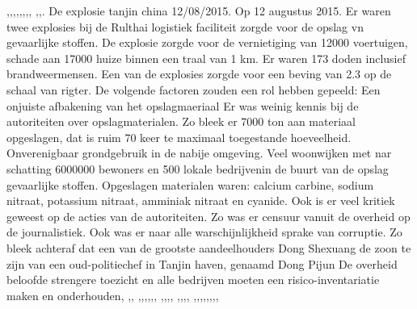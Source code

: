 \cite{wikiSchipholbrand},\cite{schipholbrand27102005video},\cite{onderzoeksraad2610schipholoost},\cite{schipholbrandvideoargos},\cite{nunl30052023feitenoverzicht},\cite{singeluitgeverijenSchipholbrand},\cite{eenvandaagschipholbrand},\cite{parlementairemonitorschipholbrand},
\cite{videonpoNOVA13112008},\cite{rizoomes01052014schipholbrand},\cite{heuvelkroesschipholbrandcamerabeelden}. 
\newline \indent De explosie tanjin china 12/08/2015. 
Op 12 augustus 2015. Er waren twee explosies bij de Rulthai logistiek  faciliteit zorgde voor de opslag vn  gevaarlijke stoffen. De explosie zorgde voor de vernietiging van 12000 voertuigen, schade aan 17000 huize binnen een traal van 1 km. Er waren 173 doden inclusief brandweermensen.
Een van de explosies zorgde voor  een beving van 2.3 op de schaal van rigter.
De volgende factoren zouden een rol hebben gepeeld:
Een onjuiste afbakening van het opslagmaeriaal
Er was  weinig kennis bij de autoriteiten over  opslagmaterialen. Zo bleek er 7000 ton aan materiaal opgeslagen, dat is ruim 70 keer te maximaal toegestande hoeveelheid. 
Onverenigbaar grondgebruik in de nabije omgeving. Veel woonwijken met nar schatting 6000000 bewoners en 500 lokale bedrijvenin de buurt van de opslag gevaarlijke stoffen.
Opgeslagen materialen  waren: calcium carbine, sodium nitraat, potassium nitraat, amminiak nitraat en cyanide.
Ook is er veel kritiek geweest op de acties van de autoriteiten. Zo was er censuur vanuit de overheid op de journalistiek.
Ook was er naar alle warschijnlijkheid sprake van corruptie. Zo bleek achteraf dat een van de grootste aandeelhouders Dong Shexuang de zoon te zijn van een oud-politiechef in Tanjin haven, genaamd Dong Pijun
De overheid beloofde strengere toezicht en alle bedrijven moeten een risico-inventariatie maken en onderhouden\cite{jiang16042019TanjinExplosion},
\cite{staff31082015tanjinblastunrevealed},\cite{chinafile18082015tanjinexplosion},
\cite{pinghuang2410201TanjinFactreport},\cite{portoTanjinExplosionSight},\cite{imago17082015TanjinApartmentImages},\cite{trager14082015Chemicalblast},\cite{pangeramo27082015TanjinExplosion},\cite{ap06082020ammaniumnitrate},
\cite{morris14082015TanjinIndustryImpact},\cite{milesyu20082015exposingtoxicgovlines},\cite{artemis30032016tanjininsurance},\cite{aidenxiatanjinblast},
\cite{danwangTanjinflexreport},\cite{keyHighlightsTanjin},\cite{hartley13082015videofootage},\cite{odonnel01062017firetanjinblast2015},
\cite{fan15082015newyorkermistrustchina},\cite{yanlidongchinamediaframingTanjin},\cite{evans27092017TnjinInsurance},\cite{jasi26032019chineschemplant},\cite{shiqingTanjinExecutiveSentence},\cite{sophiebeach15082015},\cite{hamzeh05082020BeirutBlast},\cite{chemwatch18082015TanjiinExplosion},
